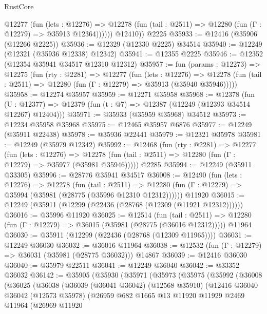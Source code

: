 \begin{lexlean}{RustCore}
\begin{coremodule}
            @12277
              (fun (lets : @12276) =>
              @12278 (fun (tail : @2511) => @12280 (fun (Γ : @12279) => @35913 @12364))))))
        @12410))
    @2225
@35933 := @12416 (@35906 (@12266 @2225))
@35936 := @12329 (@12330 @2225) @34514
@35940 := @12249 (@12321 (@35936 @12338) @12342)
@35941 := @12355 @2225
@35946 := @12352 (@12354 @35941 @34517 @12310 @12312)
@35957 := fun (params : @12273) =>
  @12275
    (fun (rty : @2281) =>
    @12277
      (fun (lets : @12276) =>
      @12278 (fun (tail : @2511) => @12280 (fun (Γ : @12279) => @35913 (@35940 @35946)))))
@35958 := @12274 @35957
@35959 := @12271 @35958
@35968 := @12378
    (fun (U : @12377) => @12379 (fun (t : @7) => @12387 (@12249 (@12393 @34514 @12267) @12404)))
@35971 := @35933 (@35959 @35968) @34512
@35973 := @12234 @35958 @35968
@35975 := @12465 @35957 @6876
@35977 := @12249 (@35911 @22438)
@35978 := @35936 @22441
@35979 := @12321 @35978
@35981 := @12249 (@35979 @12342)
@35992 := @12468
    (fun (rty : @2281) =>
    @12277
      (fun (lets : @12276) =>
      @12278 (fun (tail : @2511) => @12280 (fun (Γ : @12279) => @35977 (@35981 @35946)))))
    @2285
@35994 := @12249 (@35911 @33305)
@35996 := @28776 @35941 @34517
@36008 := @12490
    (fun (lets : @12276) =>
    @12278
      (fun (tail : @2511) =>
      @12280 (fun (Γ : @12279) => @35994 (@35981 (@28775 (@35996 @12310 @12312))))))
    @11920
@36015 := @12249 (@35911 (@12299 (@22436 (@28768 (@12309 (@11921 @12312))))))
@36016 := @35996 @11920
@36025 := @12514
    (fun (tail : @2511) => @12280 (fun (Γ : @12279) => @36015 (@35981 (@28775 (@36016 @12312)))))
    @11964
@36030 := @35911 (@12299 (@22436 (@28768 (@12309 @11965))))
@36031 := @12249 @36030
@36032 := @36016 @11964
@36038 := @12532 (fun (Γ : @12279) => @36031 (@35981 (@28775 @36032))) @14867
@36039 := @12416 @36030
@36040 := @35979 @22511
@36041 := @12249 @36040
@36042 := @33352 @36032
@36142 := @35905
    (@35930
      (@35971
        (@35973
          (@35975
            (@35992
              (@36008
                (@36025
                  (@36038
                    (@36039
                      (@36041 @36042)
                      (@12568 @35910)
                      (@12416
                        @36040
                        @36042
                        (@12573 @35978)
                        (@26959
                          @682
                          @1665
                          @13
                          @11920
                          @11929
                          @2469
                          @11964
                          (@26969
                            @11920

\end{coremodule}
\end{lexlean}
